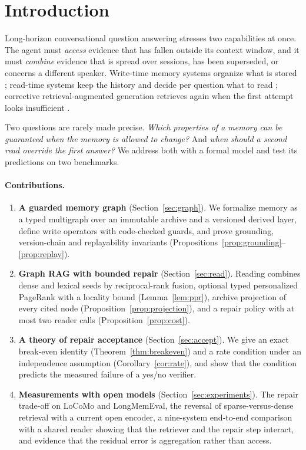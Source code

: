 \documentclass[10pt]{article}
\theoremstyle{plain}
\theoremstyle{definition}
\theoremstyle{remark}
\begin{document}
\section{Introduction}
\label{sec:intro}

Long-horizon conversational question answering stresses two capabilities at
once. The agent must \emph{access} evidence that has fallen outside its context
window, and it must \emph{combine} evidence that is spread over sessions, has been
superseded, or concerns a different speaker. Write-time memory systems organize
what is stored \citep{packer2023memgpt,chhikara2025mem0,amem2025,memoryr12025,cao2026higmem};
read-time systems keep the history and decide per question what to read
\citep{du2026memr3,wang2026cuemem,liu2026livectx,chen2026justmem,yu2026lazymem};
corrective retrieval-augmented generation retrieves again when the first attempt
looks insufficient \citep{jiang2023active,asai2023selfrag,yan2024crag}.

Two questions are rarely made precise. \emph{Which properties of a memory can be
guaranteed when the memory is allowed to change?} And \emph{when should a second
read override the first answer?} We address both with a formal model and test its
predictions on two benchmarks.

\paragraph{Contributions.}
\begin{enumerate}
  \item \textbf{A guarded memory graph} (Section~\ref{sec:graph}). We formalize memory as a typed
  multigraph over an immutable archive and a versioned derived layer, define
  write operators with code-checked guards, and prove grounding, version-chain
  and replayability invariants (Propositions~\ref{prop:grounding}--\ref{prop:replay}).
  \item \textbf{Graph RAG with bounded repair} (Section~\ref{sec:read}). Reading combines dense
  and lexical seeds by reciprocal-rank fusion, optional typed personalized
  PageRank with a locality bound (Lemma~\ref{lem:ppr}), archive projection of
  every cited node (Proposition~\ref{prop:projection}), and a repair policy with at most two
  reader calls (Proposition~\ref{prop:cost}).
  \item \textbf{A theory of repair acceptance} (Section~\ref{sec:accept}). We give an exact
  break-even identity (Theorem~\ref{thm:breakeven}) and a rate condition under an
  independence assumption (Corollary~\ref{cor:rate}), and show that the condition
  predicts the measured failure of a yes/no verifier.
  \item \textbf{Measurements with open models} (Section~\ref{sec:experiments}). The repair trade-off on
  LoCoMo and LongMemEval, the reversal of sparse-versus-dense retrieval with a
  current open encoder, a nine-system end-to-end comparison with a shared reader
  showing that the retriever and the repair step interact, and evidence that the
  residual error is aggregation rather than access.
\end{enumerate}
\end{document}

